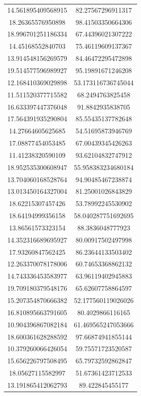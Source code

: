 \begin{table}
\begin{tabular}{cc}
14.561895409568915 & 82.27567296911317 \\
18.26365576950898 & 98.41503350664306 \\
18.996701251186334 & 67.44396021307222 \\
14.45168552840703 & 75.46119609137367 \\
13.914548156269579 & 84.46472295472898 \\
19.514577596989927 & 95.19891671246208 \\
12.168410369029898 & 53.173116736745044 \\
11.511520377715582 & 68.2494763825458 \\
16.633397447376048 & 91.8842935838705 \\
17.564391935290804 & 85.55435137782648 \\
14.27664605625685 & 54.51695873946769 \\
17.08877454053485 & 67.00439345426263 \\
11.41238320590109 & 93.62104832747912 \\
18.952535300608947 & 55.958383234680184 \\
13.704060168528764 & 94.90485467238874 \\
13.013450164327004 & 81.25001026843829 \\
18.62215307457426 & 53.78992245530902 \\
18.64194999356158 & 58.040287751692695 \\
13.86561573323154 & 88.3836048777923 \\
14.352316689695927 & 80.00917502497998 \\
17.93260847562425 & 86.23644133503402 \\
12.263370078178006 & 60.74653368862132 \\
14.743336453583977 & 63.96119402945883 \\
19.709180379548176 & 65.62607758864597 \\
15.207354870666382 & 52.177560119026026 \\
16.810895663791605 & 80.4029866116165 \\
10.904396867082184 & 61.469565247053666 \\
18.600361628288592 & 97.66874941855144 \\
10.379260066426054 & 59.75571723520587 \\
15.656226797508495 & 65.79732592862847 \\
18.05627115582997 & 51.67361423712533 \\
13.191865412062793 & 89.422845455177 \\

\end{tabular}
\end{table}
